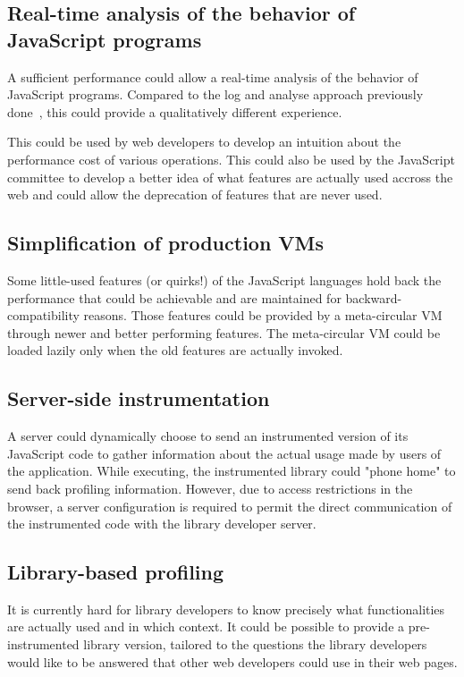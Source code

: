 \subsection{Real-time analysis of the behavior of JavaScript programs}

A sufficient performance could allow a real-time analysis of the behavior of
JavaScript programs. Compared to the log and analyse approach previously
done~\cite{behavior_js}, this could provide a qualitatively different
experience.

This could be used by web developers to develop an intuition about the
performance cost of various operations. This could also be used by the
JavaScript committee to develop a better idea of what features are actually
used accross the web and could allow the deprecation of features that are never
used.

\subsection{Simplification of production VMs}

Some little-used features (or quirks!) of the JavaScript languages hold back
the performance that could be achievable and are maintained for
backward-compatibility reasons. Those features could be provided by a
meta-circular VM through newer and better performing features.  The
meta-circular VM could be loaded lazily only when the old features are actually
invoked.

\subsection{Server-side instrumentation}

A server could dynamically choose to send an instrumented version of its
JavaScript code to gather information about the actual usage made by users of
the application. While executing, the instrumented library could "phone home"
to send back profiling information. However, due to access restrictions in the
browser, a server configuration is required to permit the direct communication
of the instrumented code with the library developer server.

\subsection{Library-based profiling}

It is currently hard for library developers to know precisely what
functionalities are actually used and in which context. It could be possible to
provide a pre-instrumented library version, tailored to the questions the
library developers would like to be answered that other web developers could
use in their web pages. 

